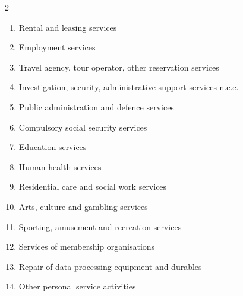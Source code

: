 \begin{multicols}{2}
\begin{enumerate}[leftmargin=*,itemsep=0pt,parsep=0pt]
\item Rental and leasing services
\item Employment services
\item Travel agency, tour operator, other reservation services
\item Investigation, security, administrative support services n.e.c.
\item Public administration and defence services
\item Compulsory social security services
\item Education services
\item Human health services
\item Residential care and social work services
\item Arts, culture and gambling services
\item Sporting, amusement and recreation services
\item Services of membership organisations
\item Repair of data processing equipment and durables
\item Other personal service activities
\end{enumerate}

\end{multicols}

